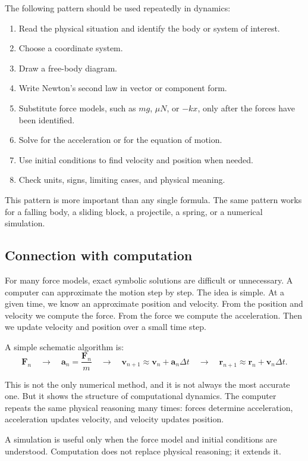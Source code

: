 The following pattern should be used repeatedly in dynamics:
\begin{enumerate}
\item Read the physical situation and identify the body or system of interest.
\item Choose a coordinate system.
\item Draw a free-body diagram.
\item Write Newton's second law in vector or component form.
\item Substitute force models, such as \(mg\), \(\mu N\), or \(-kx\), only after the forces have been identified.
\item Solve for the acceleration or for the equation of motion.
\item Use initial conditions to find velocity and position when needed.
\item Check units, signs, limiting cases, and physical meaning.
\end{enumerate}

This pattern is more important than any single formula. The same pattern works for a falling body, a sliding block, a projectile, a spring, or a numerical simulation.

\subsection{Connection with computation}

For many force models, exact symbolic solutions are difficult or unnecessary. A computer can approximate the motion step by step. The idea is simple. At a given time, we know an approximate position and velocity. From the position and velocity we compute the force. From the force we compute the acceleration. Then we update velocity and position over a small time step.

A simple schematic algorithm is:
\[
\mathbf{F}_n
\quad \longrightarrow \quad
\mathbf{a}_n=\frac{\mathbf{F}_n}{m}
\quad \longrightarrow \quad
\mathbf{v}_{n+1}\approx \mathbf{v}_n+\mathbf{a}_n\Delta t
\quad \longrightarrow \quad
\mathbf{r}_{n+1}\approx \mathbf{r}_n+\mathbf{v}_n\Delta t.
\]

This is not the only numerical method, and it is not always the most accurate one. But it shows the structure of computational dynamics. The computer repeats the same physical reasoning many times: forces determine acceleration, acceleration updates velocity, and velocity updates position.

\begin{remarkbox}
A simulation is useful only when the force model and initial conditions are understood. Computation does not replace physical reasoning; it extends it.
\end{remarkbox}

